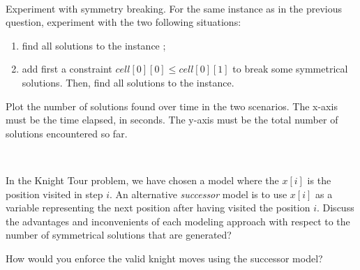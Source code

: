 \documentclass[12pt]{report}
\newcommand{\answerbox}[2]{\hfill\break\\
	\framebox[\linewidth]{\parbox[c][#1][c]{\dimexpr\linewidth-2\fboxsep-2\fboxrule}{#2}}
}
\begin{document}
\begin{Exercise}[title={Modeling the Magic Square Problem}]
		\answerbox{2cm}{
		}

		\Question Experiment with symmetry breaking. For the same instance as in the previous question, experiment with the two following situations:
		\begin{enumerate}
			\item find all solutions to the instance ;
			\item add first a constraint $cell[0][0] \leq cell[0][1]$ to break some symmetrical solutions. Then, find all solutions to the instance.
		\end{enumerate}
		Plot the number of solutions found over time in the two scenarios. The x-axis must be the time elapsed, in seconds. The y-axis must be the total number of solutions encountered so far.

		\answerbox{10cm}{
		}

	\end{Exercise}

	\pagebreak

	\begin{Exercise}[title={Knight Tour}]

		In the Knight Tour problem, we have chosen a model
		where the $x[i]$ is the position visited in step $i$.
		An alternative \textit{successor} model is to use $x[i]$ as a variable representing
		the next position after having visited the position $i$.
		\Question Discuss the advantages and inconvenients of each modeling approach with respect 
		to the number of symmetrical solutions that are generated?
		\answerbox{6cm}{
		}
		\Question How would you enforce the valid knight moves using the successor model?
		\answerbox{7cm}{
		}

	\end{Exercise}
\end{document}
